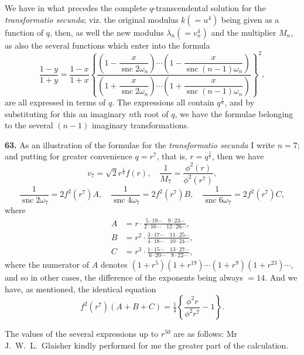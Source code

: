\documentclass[12pt,a4paper]{article}
\DeclareMathOperator{\snc}{snc}
\begin{document}
We have in what precedes the complete $q$-transcendental solution for the \textit{transformatio secunda}; viz. the original modulus $k(= u^4)$ being given as a function of $q$, then, as well the new modulus $\lambda_n (= v_n^4)$ and the multiplier $M_n$, as also the several functions which enter into the formula
\[
\frac{1 - y}{1 + y} = \frac{1 - x}{1 + x}
\left\{
\frac{\left(1 - \dfrac{x}{\snc 2\omega_n}\right) \cdots
\left(1 - \dfrac{x}{\snc (n-1)\omega_n}\right)}
{\left(1 + \dfrac{x}{\snc 2\omega_n}\right) \cdots
\left(1 + \dfrac{x}{\snc (n-1)\omega_n}\right)}
\right\}^2,
\]
are all expressed in terms of $q$. The expressions all contain $q^{\frac{1}{n}}$, and by substituting for this an imaginary $n$th root of $q$, we have the formulae belonging to the several $(n-1)$ imaginary transformations.

\textbf{63.} As an illustration of the formulae for the \textit{transformatio secunda} I write $n = 7$; and putting for greater convenience $q = r^7$, that is, $r = q^{\frac{1}{7}}$, then we have
\[
v_7 = \sqrt{2} r^{\frac{1}{8}} f(r), \quad
\frac{1}{M_7} = \frac{\phi^2(r)}{\phi^2(r^7)},
\]
\[
\frac{1}{\snc 2\omega_7} = 2f^2(r^7)A, \quad
\frac{1}{\snc 4\omega_7} = 2f^2(r^7)B, \quad
\frac{1}{\snc 6\omega_7} = 2f^2(r^7)C,
\]
where
\begin{align*}
A &= r \cdot \frac{5 \cdot 19 \cdots \quad 9 \cdot 23 \cdots}{2 \cdot 16 \cdots \quad 12 \cdot 26 \cdots}, \\
B &= r^2 \cdot \frac{3 \cdot 17 \cdots \quad 11 \cdot 25 \cdots}{4 \cdot 18 \cdots \quad 10 \cdot 24 \cdots}, \\
C &= r^3 \cdot \frac{1 \cdot 15 \cdots \quad 13 \cdot 27 \cdots}{6 \cdot 20 \cdots \quad 8 \cdot 22 \cdots},
\end{align*}
where the numerator of $A$ denotes $(1 + r^5)(1 + r^{19}) \cdots (1 + r^9)(1 + r^{23}) \cdots$, and so in other cases, the difference of the exponents being always $= 14$. And we have, as mentioned, the identical equation
\[
f^2(r^7)(A + B + C) = \tfrac{1}{4}\left\{\frac{\phi^2 r}{\phi^2 r^7} - 1\right\}.
\]

The values of the several expressions up to $r^{50}$ are as follows: Mr J.~W.~L.~Glaisher kindly performed for me the greater part of the calculation.
\end{document}
